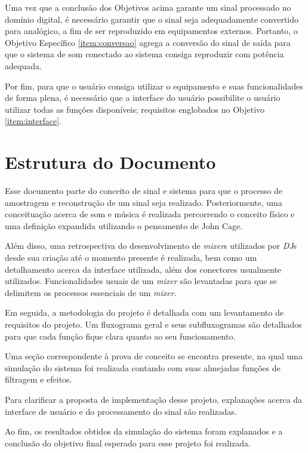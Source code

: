 Uma vez que a conclusão dos Objetivos acima garante um sinal processado no domínio digital, é necessário garantir que o sinal seja adequadamente convertido para analógico, a fim de ser reproduzido em equipamentos externos. Portanto, o Objetivo Específico \ref{item:conversao} agrega a conversão do sinal de saída para que o sistema de som conectado ao sistema consiga reproduzir com potência adequada. 

Por fim, para que o usuário consiga utilizar o equipamento e suas funcionalidades de forma plena, é necessário que a interface do usuário possibilite o usuário utilizar todas as funções disponíveis; requisitos englobados no Objetivo \ref{item:interface}.

\section{Estrutura do Documento}

Esse documento parte do conceito de sinal e sistema para que o processo de amostragem e reconstrução de um sinal seja realizado. Posteriormente, uma conceituação acerca de som e música é realizada percorrendo o conceito físico e uma definição expandida utilizando o pensamento de John Cage.

Além disso, uma retrospectiva do desenvolvimento de \textit{mixer}s utilizados por \textit{DJ}s desde sua criação até o momento presente é realizada, bem como um detalhamento acerca da interface utilizada, além dos conectores usualmente utilizados. Funcionalidades usuais de um \textit{mixer} são levantadas para que se delimitem os processos essenciais de um \textit{mixer}.

Em seguida, a metodologia do projeto é detalhada com um levantamento de requisitos do projeto. Um fluxograma geral e seus subfluxogramas são detalhados para que cada função fique clara quanto ao seu funcionamento.

Uma seção correspondente à prova de conceito se encontra presente, na qual uma simulação do sistema foi realizada contando com suas almejadas funções de filtragem e efeitos.

Para clarificar a proposta de implementação desse projeto, explanações acerca da interface de usuário e do processamento do sinal são realizadas.

Ao fim, os resultados obtidos da simulação do sistema foram explanados e a conclusão do objetivo final esperado para esse projeto foi realizada.
